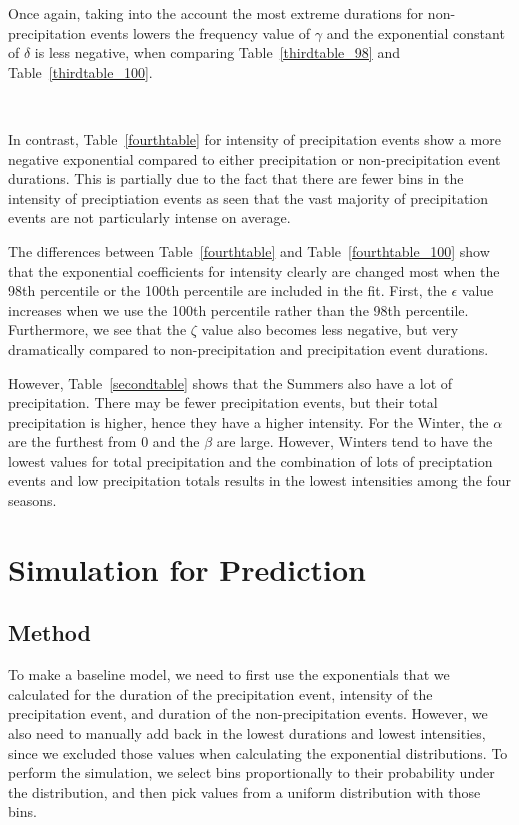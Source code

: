 \documentclass[11pt]{report}
\begin{document}
Once again, taking into the account the most extreme durations for
non-precipitation events lowers the frequency value of $\gamma$ and the
exponential constant of $\delta$ is less negative, when comparing
Table~\ref{thirdtable_98} and Table~\ref{thirdtable_100}.

\





In contrast, Table~\ref{fourthtable} for intensity of precipitation events
show a more negative exponential compared to either precipitation or
non-precipitation event durations. This is partially due to the fact that
there are fewer bins in the intensity of preciptiation events as seen that
the vast majority of precipitation events are not particularly intense on
average.

The differences between Table~\ref{fourthtable} and
Table~\ref{fourthtable_100} show that the exponential coefficients for
intensity clearly are changed most when the 98th percentile or the 100th
percentile are included in the fit. First, the $\epsilon$ value increases
when we use the 100th percentile rather than the 98th
percentile. Furthermore, we see that the $\zeta$ value also becomes less
negative, but very dramatically compared to non-precipitation and
precipitation event durations.

However, Table~\ref{secondtable} shows that the Summers also have a lot of
precipitation. There may be fewer precipitation events, but their total
precipitation is higher, hence they have a higher intensity.  For the
Winter, the $\alpha$ are the furthest from 0 and the $\beta$ are
large. However, Winters tend to have the lowest values for total
precipitation and the combination of lots of preciptation events and low
precipitation totals results in the lowest intensities among the four
seasons.


\clearpage

\section{Simulation for Prediction}\label{sec:sfp}

\subsection{Method}\label{sec:sfp_m}

To make a baseline model, we need to first use the exponentials that we
calculated for the duration of the precipitation event, intensity of the
precipitation event, and duration of the non-precipitation events. However,
we also need to manually add back in the lowest durations and lowest
intensities, since we excluded those values when calculating the exponential
distributions. To perform the simulation, we select bins proportionally to
their probability under the distribution, and then pick values from a
uniform distribution with those bins.
\end{document}

